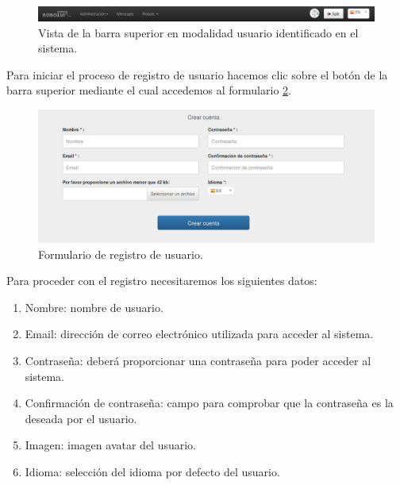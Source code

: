\begin{figure}[H]
  \begin{center}
    \includegraphics[scale=0.5]{imagenes/manual-usuario/barra-menu2.png}
  \end{center}
  \caption{Vista de la barra superior en modalidad usuario identificado en el sistema.}
  \label{website:barra-usuario}
\end{figure}


Para iniciar el proceso de registro de usuario hacemos clic sobre el botón de la barra superior  mediante el cual accedemos al formulario \ref{website:formulario-registro}.

\begin{figure}[H]
  \begin{center}
    \includegraphics[scale=0.4]{imagenes/manual-usuario/pagina-registro.png}
  \end{center}
  \caption{Formulario de registro de usuario.}
  \label{website:formulario-registro}
\end{figure}

Para proceder con el registro necesitaremos los siguientes datos:

\begin{enumerate}
 \item Nombre: nombre de usuario.
 \item Email: dirección de correo electrónico utilizada para acceder al sistema.
 \item Contraseña: deberá proporcionar una contraseña para poder acceder al sistema.
 \item Confirmación de contraseña: campo para comprobar que la contraseña es la deseada por el usuario.
 \item Imagen: imagen avatar del usuario.
 \item Idioma: selección del idioma por defecto del usuario.
\end{enumerate}

